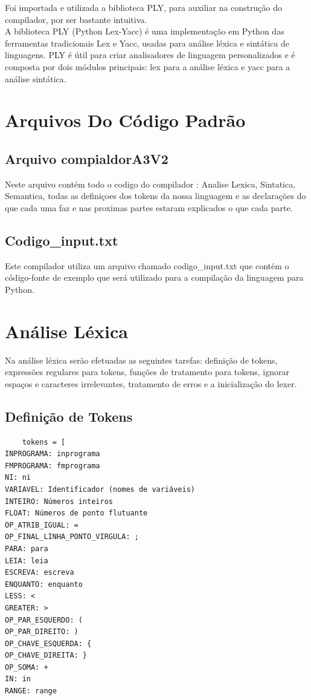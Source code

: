 \documentclass[a4paper,12pt]{article}
\begin{document}
Foi importada e utilizada a biblioteca PLY, para auxiliar na construção 
do compilador, por ser bastante intuitiva.\\

A biblioteca PLY (Python Lex-Yacc) é uma implementação em Python das 
ferramentas tradicionais Lex e Yacc, usadas para análise léxica e 
sintática de linguagens. PLY é útil para criar analisadores de linguagem 
personalizados e é composta por dois módulos principais: lex para a 
análise léxica e yacc para a análise sintática.

\section{Arquivos Do Código Padrão}

\subsection{Arquivo compialdorA3V2}
Neste arquivo contém todo o codigo do compilador : Analise Lexica, 
Sintatica, Semantica, todas as definiçoes dos tokens da nossa linguagem 
e as declarações do que cada uma faz e nas proximas partes estaram 
explicados o que cada parte.

\subsection{Codigo\_input.txt}
Este compilador utiliza um arquivo chamado codigo\_input.txt que contém 
o código-fonte de exemplo que será utilizado para a compilação da 
linguagem para Python.

\section{Análise Léxica}
Na análise léxica serão efetuadas as seguintes tarefas: definição de 
tokens, expressões regulares para tokens, funções de tratamento para 
tokens, ignorar espaços e caracteres irrelevantes, tratamento de erros e 
a inicialização do lexer.


\subsection{Definição de Tokens}

\begin{BVerbatim}
    tokens = [
INPROGRAMA: inprograma
FMPROGRAMA: fmprograma
NI: ni
VARIAVEL: Identificador (nomes de variáveis)
INTEIRO: Números inteiros
FLOAT: Números de ponto flutuante
OP_ATRIB_IGUAL: =
OP_FINAL_LINHA_PONTO_VIRGULA: ;
PARA: para
LEIA: leia
ESCREVA: escreva
ENQUANTO: enquanto
LESS: <
GREATER: >
OP_PAR_ESQUERDO: (
OP_PAR_DIREITO: )
OP_CHAVE_ESQUERDA: {
OP_CHAVE_DIREITA: }
OP_SOMA: +
IN: in
RANGE: range
\end{BVerbatim}
\\
\end{document}
